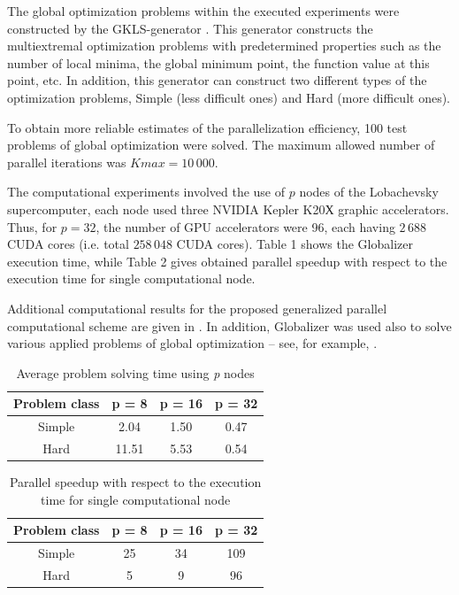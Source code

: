 \documentclass[12pt]{amsart}
\begin{document}
The global optimization problems within the executed experiments were constructed by the GKLS-generator \cite{Gaviano}. This generator constructs the multiextremal optimization problems with predetermined properties such as the number of local minima, the global minimum point, the function value at this point, etc. In addition, this generator can construct two different types of the optimization problems, Simple (less difficult ones) and Hard (more difficult ones).

To obtain more reliable estimates of the parallelization efficiency, 100 test problems of global optimization were solved. The maximum allowed number of parallel iterations was $Kmax = 10\,000$.

The computational experiments involved the use of $p$ nodes of the Lobachevsky supercomputer, each node used three NVIDIA Kepler K20Х graphic accelerators. Thus, for $p = 32$, the number of GPU accelerators were 96, each having $2\,688$ CUDA cores (i.e. total $258\,048$ CUDA cores). Table 1 shows the Globalizer execution time, while Table 2 gives obtained parallel speedup with respect to the execution time for single computational node.

Additional computational results for the proposed generalized parallel computational scheme are given in \cite{Gergel1, Gergel2, Barkalov, Gergel3, Gergel4}. In addition, Globalizer was used also to solve various applied problems of global optimization -- see, for example, \cite{Modorskii, Gergel6}.

\begin{table}
	\caption{Average problem solving time using \textit{p} nodes}
	\label{tab:tab1}
	\center
	\begin{tabular}{|c|c|c|c|}
	\hline 
		Problem class & \parbox[c]{1.6cm}{ \centering p = 8 } & 
		\parbox[c]{1.6cm}{ \centering p = 16 } &
		\parbox[c]{1.6cm}{ \centering p = 32 } \\
	\hline 
		Simple &  2.04 & 1.50 & 0.47 \\
	\hline 
		Hard   & 11.51 & 5.53 & 0.54 \\
	\hline 
	\end{tabular}
\end{table}

\begin{table}
	\caption{Parallel speedup with respect to the execution time for single computational node}
	\label{tab:tab1}
	\center
	\begin{tabular}{|c|c|c|c|}
	\hline 
		Problem class & \parbox[c]{1.6cm}{ \centering p = 8 } & 
		\parbox[c]{1.6cm}{ \centering p = 16 } &
		\parbox[c]{1.6cm}{ \centering p = 32 } \\
	\hline 
		Simple & 25 & 34 & 109 \\
	\hline 
		Hard   & 5  & 9  & 96  \\
	\hline 
	\end{tabular}
\end{table}
\end{document}
